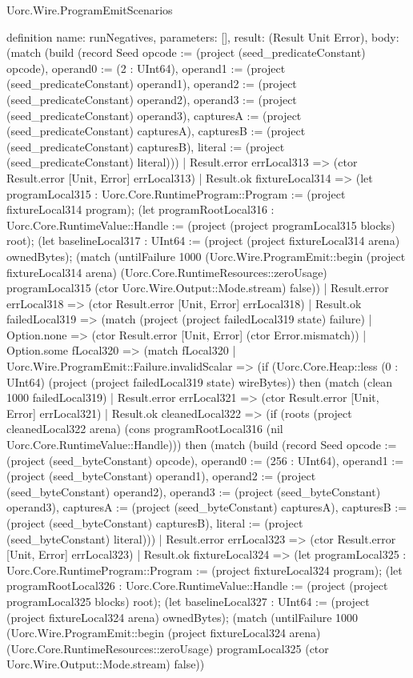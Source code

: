 \begin{lexlean}{Uorc.Wire.ProgramEmitScenarios}
\begin{semanticmodule}
definition{
  name: runNegatives,
  parameters: [],
  result: (Result Unit Error),
  body: (match (build (record Seed {opcode := (project (seed_predicateConstant) opcode), operand0 := (2 : UInt64), operand1 := (project (seed_predicateConstant) operand1), operand2 := (project (seed_predicateConstant) operand2), operand3 := (project (seed_predicateConstant) operand3), capturesA := (project (seed_predicateConstant) capturesA), capturesB := (project (seed_predicateConstant) capturesB), literal := (project (seed_predicateConstant) literal)}))
    | Result.error errLocal313 => (ctor Result.error [Unit, Error] errLocal313)
    | Result.ok fixtureLocal314 => (let programLocal315 : Uorc.Core.RuntimeProgram::Program := (project fixtureLocal314 program); (let programRootLocal316 : Uorc.Core.RuntimeValue::Handle := (project (project programLocal315 blocks) root); (let baselineLocal317 : UInt64 := (project (project fixtureLocal314 arena) ownedBytes); (match (untilFailure 1000 (Uorc.Wire.ProgramEmit::begin (project fixtureLocal314 arena) (Uorc.Core.RuntimeResources::zeroUsage) programLocal315 (ctor Uorc.Wire.Output::Mode.stream) false))
      | Result.error errLocal318 => (ctor Result.error [Unit, Error] errLocal318)
      | Result.ok failedLocal319 => (match (project (project failedLocal319 state) failure)
        | Option.none => (ctor Result.error [Unit, Error] (ctor Error.mismatch))
        | Option.some fLocal320 => (match fLocal320
          | Uorc.Wire.ProgramEmit::Failure.invalidScalar => (if (Uorc.Core.Heap::less (0 : UInt64) (project (project failedLocal319 state) wireBytes)) then (match (clean 1000 failedLocal319)
            | Result.error errLocal321 => (ctor Result.error [Unit, Error] errLocal321)
            | Result.ok cleanedLocal322 => (if (roots (project cleanedLocal322 arena) (cons programRootLocal316 (nil Uorc.Core.RuntimeValue::Handle))) then (match (build (record Seed {opcode := (project (seed_byteConstant) opcode), operand0 := (256 : UInt64), operand1 := (project (seed_byteConstant) operand1), operand2 := (project (seed_byteConstant) operand2), operand3 := (project (seed_byteConstant) operand3), capturesA := (project (seed_byteConstant) capturesA), capturesB := (project (seed_byteConstant) capturesB), literal := (project (seed_byteConstant) literal)}))
              | Result.error errLocal323 => (ctor Result.error [Unit, Error] errLocal323)
              | Result.ok fixtureLocal324 => (let programLocal325 : Uorc.Core.RuntimeProgram::Program := (project fixtureLocal324 program); (let programRootLocal326 : Uorc.Core.RuntimeValue::Handle := (project (project programLocal325 blocks) root); (let baselineLocal327 : UInt64 := (project (project fixtureLocal324 arena) ownedBytes); (match (untilFailure 1000 (Uorc.Wire.ProgramEmit::begin (project fixtureLocal324 arena) (Uorc.Core.RuntimeResources::zeroUsage) programLocal325 (ctor Uorc.Wire.Output::Mode.stream) false))
}
\end{semanticmodule}
\end{lexlean}
